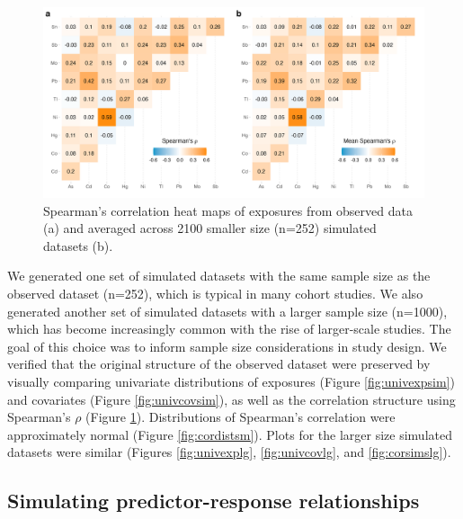 \documentclass[12pt, twoside]{amherstthesis}
\begin{document}
\begin{figure}

{\centering \includegraphics[width=1\linewidth]{figures/ch4_corr_sim+orig} 

}

\caption{Spearman's correlation heat maps of exposures from observed data (a) and averaged across 2100 smaller size (n=252) simulated datasets (b).}\label{fig:corsimssm}
\end{figure}
We generated one set of simulated datasets with the same sample size as the observed dataset (n=252), which is typical in many cohort studies. We also generated another set of simulated datasets with a larger sample size (n=1000), which has become increasingly common with the rise of larger-scale studies. The goal of this choice was to inform sample size considerations in study design. We verified that the original structure of the observed dataset were preserved by visually comparing univariate distributions of exposures (Figure \ref{fig:univexpsim}) and covariates (Figure \ref{fig:univcovsim}), as well as the correlation structure using Spearman's \(\rho\) (Figure \ref{fig:corsimssm}). Distributions of Spearman's correlation were approximately normal (Figure \ref{fig:cordistsm}). Plots for the larger size simulated datasets were similar (Figures \ref{fig:univexplg}, \ref{fig:univcovlg}, and \ref{fig:corsimslg}).

\hypertarget{simresp}{%
\subsection{Simulating predictor-response relationships}\label{simresp}}
\end{document}
